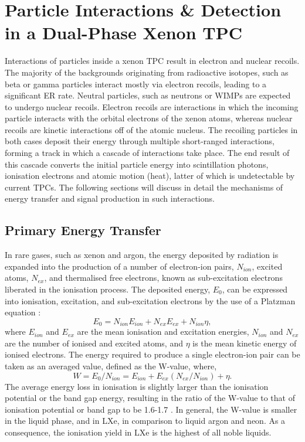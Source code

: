 \section{Particle Interactions \& Detection in a Dual-Phase Xenon TPC}
\label{sec:xenonphysics}

Interactions of particles inside a xenon TPC result in electron and nuclear recoils. The majority of the backgrounds originating from radioactive isotopes, such as beta or gamma particles interact mostly via electron recoils, leading to a significant ER rate. Neutral particles, such as neutrons or WIMPs are expected to undergo nuclear recoils. Electron recoils are interactions in which the incoming particle interacts with the orbital electrons of the xenon atoms, whereas nuclear recoils are kinetic interactions off of the atomic nucleus. The recoiling particles in both cases deposit their energy through multiple short-ranged interactions, forming a track in which a cascade of interactions take place. The end result of this cascade converts the initial particle energy into scintillation photons, ionisation electrons and atomic motion (heat), latter of which is undetectable by current TPCs. The following sections will discuss in detail the mechanisms of energy transfer and signal production in such interactions.

\subsection{Primary Energy Transfer}
\label{sec:energy_transfer}

In rare gases, such as xenon and argon, the energy deposited by radiation is expanded into the production of a number of electron-ion pairs, $N_{ion}$, excited atoms, $N_{ex}$, and thermalised free electrons, known as sub-excitation electrons liberated in the ionisation process. The deposited energy, $E_{0}$, can be expressed into ionisation, excitation, and sub-excitation electrons by the use of a Platzman equation \cite{Platzman, xenon_physics}:
%
\begin{equation} \label{eq:e_transfer}
    E_{0} = N_{ion}E_{ion} + N_{ex}E_{ex} + N_{ion}\eta,
\end{equation} 
%
where $E_{ion}$ and $E_{ex}$ are the mean ionisation and excitation energies, $N_{ion}$ and $N_{ex}$ are the number of ionised and excited atoms, and $\eta$ is the mean kinetic energy of ionised electrons. The energy required to produce a single electron-ion pair can be taken as an averaged value, defined as the W-value, where,
%
\begin{equation} \label{eq:w_value}
    W = E_{0}/N_{ion} = E_{ion} + E_{ex}(N_{ex}/N_{ion}) + \eta.
\end{equation} 
%
The average energy loss in ionisation is slightly larger than the ionisation potential or the band gap energy, resulting in the ratio of the W-value to that of ionisation potential or band gap to be 1.6-1.7 \cite{PhysRevA.48.1313}. In general, the W-value is smaller in the liquid phase, and in LXe, in comparison to liquid argon and neon. As a consequence, the ionisation yield in LXe is the highest of all noble liquids.

